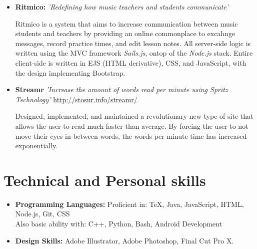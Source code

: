 \documentclass[11pt,a4paper,roman]{moderncv}        %
\begin{document}
\begin{itemize}

\item{\textbf{Ritmico:} \textit{'Redefining how music teachers and students communicate'}

\vspace{3pt}

\small{Ritmico is a system that aims to increase communication between music students and teachers by providing an online commonplace to excahnge messages, record practice times, and edit lesson notes.  All server-side logic is written using the MVC framework \textit{Sails.js}, ontop of the \textit{Node.js} stack.  Entire client-side is written in EJS (HTML derivative), CSS, and JavaScript, with the design implementing Bootstrap.}}

\vspace{6pt}

\item{\textbf{Streamr} \textit{'Increase the amount of words read per minute using Spritz Technology'}  \url{http://stosur.info/streamr/}

\vspace{3pt}

\small{Designed, implemented, and maintained a revolutionary new type of site that allows the user to read much faster than average. By forcing the user to not move their eyes in-between words, the words per minute time has increased exponentially.}}

\vspace{6pt}

\end{itemize}

\section{Technical and Personal skills}

\vspace{6pt}

\begin{itemize}

\item \textbf{Programming Languages:} Proficient in: TeX, Java, JavaScript, HTML, Node.js, Git, CSS \\ Also basic ability with: C++, Python, Bash, Android Development

\vspace{6pt}

\item \textbf{Design Skills:} Adobe Illustrator, Adobe Photoshop, Final Cut Pro X.

\end{itemize}
\end{document}
